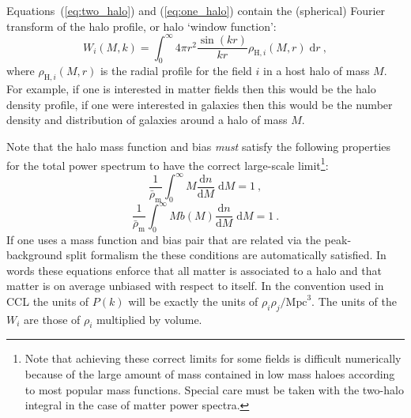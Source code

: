 \documentclass[\docopts]{\docclass}
\begin{document}
Equations~(\ref{eq:two_halo}) and (\ref{eq:one_halo}) contain the (spherical) Fourier transform of the halo profile, or halo `window function':
\begin{equation}
W_i(M,k)=\int_0^\infty4\pi r^2\frac{\sin(kr)}{kr}\rho_{\mathrm{H},i}(M,r)\;\mathrm{d}r\ ,
\label{eq:window_function}
\end{equation}
where $\rho_{\mathrm{H},i}(M,r)$ is the radial profile for the field $i$ in a host halo of mass $M$. For example, if one is interested in matter fields then this would be the halo density profile, if one were interested in galaxies then this would be the number density and distribution of galaxies around a halo of mass $M$.

Note that the halo mass function and bias \emph{must} satisfy the following properties for the total power spectrum to have the correct large-scale limit\footnote{Note that achieving these correct limits for some fields is difficult numerically because of the large amount of mass contained in low mass haloes according to most popular mass functions. Special care must be taken with the two-halo integral in the case of matter power spectra.}:
\begin{equation}
\frac{1}{\bar\rho_\mathrm{m}}\int_0^\infty M\frac{\mathrm{d}n}{\mathrm{d}M}\;\mathrm{d}M=1\ ,
\label{eq:mf_normalisation}
\end{equation}
\begin{equation}
\frac{1}{\bar\rho_\mathrm{m}}\int_0^\infty Mb(M)\frac{\mathrm{d}n}{\mathrm{d}M}\;\mathrm{d}M=1\ .
\label{eq:bias_normalisation}
\end{equation}
If one uses a mass function and bias pair that are related via the peak-background split formalism \citep{Mo1996,Sheth2001} the these conditions are automatically satisfied. In words these equations enforce that all matter is associated to a halo and that matter is on average unbiased with respect to itself. In the convention used in CCL the units of $P(k)$ will be exactly the units of $\rho_i\rho_j / \mathrm{Mpc}^3$. The units of the $W_i$ are those of $\rho_i$ multiplied by volume.
\end{document}
